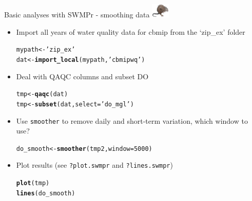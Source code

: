 \documentclass[xcolor=dvipsnames]{beamer}\usepackage[]{graphicx}\usepackage[]{color}
\makeatletter
\newcommand{\hlnum}[1]{\textcolor[rgb]{0.686,0.059,0.569}{#1}}%
\newcommand{\hlstr}[1]{\textcolor[rgb]{0.192,0.494,0.8}{#1}}%
\newcommand{\hlstd}[1]{\textcolor[rgb]{0.345,0.345,0.345}{#1}}%
\newcommand{\hlkwb}[1]{\textcolor[rgb]{0.69,0.353,0.396}{#1}}%
\newcommand{\hlkwc}[1]{\textcolor[rgb]{0.333,0.667,0.333}{#1}}%
\newcommand{\hlkwd}[1]{\textcolor[rgb]{0.737,0.353,0.396}{\textbf{#1}}}%
\newenvironment{kframe}{%
 \def\at@end@of@kframe{}%
 \ifinner\ifhmode%
  \def\at@end@of@kframe{\end{minipage}}%
  \begin{minipage}{\columnwidth}%
 \fi\fi%
 \def\FrameCommand##1{\hskip\@totalleftmargin \hskip-\fboxsep
 \colorbox{shadecolor}{##1}\hskip-\fboxsep
     \hskip-\linewidth \hskip-\@totalleftmargin \hskip\columnwidth}%
 \MakeFramed {\advance\hsize-\width
   \@totalleftmargin\z@ \linewidth\hsize
   \@setminipage}}%
 {\par\unskip\endMakeFramed%
 \at@end@of@kframe}
\newenvironment{knitrout}{}{} %
\makeatother
\begin{document}
\begin{frame}[fragile]{Basic analyses with SWMPr - smoothing data \includegraphics[width = 0.065\textwidth]{imgs/swmprat.png}}
\begin{itemize}
\item {}
Import all years of water quality data for cbmip from the `zip\_ex' folder
\begin{knitrout}\scriptsize
{}\color{fgcolor}\begin{kframe}
\begin{alltt}
\hlstd{mypath} \hlkwb{<-} \hlstr{'zip_ex'}
\hlstd{dat} \hlkwb{<-} \hlkwd{import_local}\hlstd{(mypath,} \hlstr{'cbmipwq'}\hlstd{)}
\end{alltt}
\end{kframe}
\end{knitrout}
\vspace{0.1in}
\item {}
Deal with QAQC columns and subset DO
\begin{knitrout}\scriptsize
{}\color{fgcolor}\begin{kframe}
\begin{alltt}
\hlstd{tmp} \hlkwb{<-} \hlkwd{qaqc}\hlstd{(dat)}
\hlstd{tmp} \hlkwb{<-} \hlkwd{subset}\hlstd{(dat,} \hlkwc{select} \hlstd{=} \hlstr{'do_mgl'}\hlstd{)}
\end{alltt}
\end{kframe}
\end{knitrout}
\vspace{0.1in}
\item {}
Use \texttt{smoother} to remove daily and short-term variation, which window to use?
\begin{knitrout}\scriptsize
{}\color{fgcolor}\begin{kframe}
\begin{alltt}
\hlstd{do_smooth} \hlkwb{<-} \hlkwd{smoother}\hlstd{(tmp2,} \hlkwc{window} \hlstd{=} \hlnum{5000}\hlstd{)}
\end{alltt}
\end{kframe}
\end{knitrout}
\vspace{0.1in}
\item {}
Plot results (see \texttt{?plot.swmpr} and \texttt{?lines.swmpr})
\begin{knitrout}\scriptsize
{}\color{fgcolor}\begin{kframe}
\begin{alltt}
\hlkwd{plot}\hlstd{(tmp)}
\hlkwd{lines}\hlstd{(do_smooth)}
\end{alltt}
\end{kframe}
\end{knitrout}
\end{itemize}
\end{frame}
\end{document}
